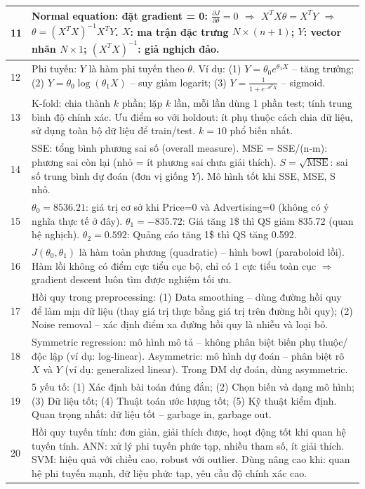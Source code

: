 \documentclass[10pt]{article}
\begin{document}
\begin{singlespace}
\begin{longtable}{|p{}|p{}|}
\hline
11 & Normal equation: đặt gradient = 0: $\frac{\partial J}{\partial \theta} = 0$ $\Rightarrow$ $X^TX\theta = X^TY$ $\Rightarrow$ $\theta = (X^TX)^{-1}X^TY$. $X$: ma trận đặc trưng $N \times (n+1)$; $Y$: vector nhãn $N \times 1$; $(X^TX)^{-1}$: giả nghịch đảo. \\
\hline
12 & Phi tuyến: $Y$ là hàm phi tuyến theo $\theta$. Ví dụ: (1) $Y = \theta_0 e^{\theta_1 X}$ -- tăng trưởng; (2) $Y = \theta_0 \log(\theta_1 X)$ -- suy giảm logarit; (3) $Y = \frac{1}{1+e^{-\theta^TX}}$ -- sigmoid. \\
\hline
13 & K-fold: chia thành $k$ phần; lặp $k$ lần, mỗi lần dùng 1 phần test; tính trung bình độ chính xác. Ưu điểm so với holdout: ít phụ thuộc cách chia dữ liệu, sử dụng toàn bộ dữ liệu để train/test. $k=10$ phổ biến nhất. \\
\hline
14 & SSE: tổng bình phương sai số (overall measure). MSE = SSE/(n-m): phương sai còn lại (nhỏ = ít phương sai chưa giải thích). $S = \sqrt{\text{MSE}}$: sai số trung bình dự đoán (đơn vị giống $Y$). Mô hình tốt khi SSE, MSE, S nhỏ. \\
\hline
15 & $\theta_0 = 8536.21$: giá trị cơ sở khi Price=0 và Advertising=0 (không có ý nghĩa thực tế ở đây). $\theta_1 = -835.72$: Giá tăng 1\$ thì QS giảm 835.72 (quan hệ nghịch). $\theta_2 = 0.592$: Quảng cáo tăng 1\$ thì QS tăng 0.592. \\
\hline
16 & $J(\theta_0, \theta_1)$ là hàm toàn phương (quadratic) -- hình bowl (paraboloid lồi). Hàm lồi không có điểm cực tiểu cục bộ, chỉ có 1 cực tiểu toàn cục $\Rightarrow$ gradient descent luôn tìm được nghiệm tối ưu. \\
\hline
17 & Hồi quy trong preprocessing: (1) Data smoothing -- dùng đường hồi quy để làm mịn dữ liệu (thay giá trị thực bằng giá trị trên đường hồi quy); (2) Noise removal -- xác định điểm xa đường hồi quy là nhiễu và loại bỏ. \\
\hline
18 & Symmetric regression: mô hình mô tả -- không phân biệt biến phụ thuộc/độc lập (ví dụ: log-linear). Asymmetric: mô hình dự đoán -- phân biệt rõ $X$ và $Y$ (ví dụ: generalized linear). Trong DM dự đoán, dùng asymmetric. \\
\hline
19 & 5 yếu tố: (1) Xác định bài toán đúng đắn; (2) Chọn biến và dạng mô hình; (3) Dữ liệu tốt; (4) Thuật toán ước lượng tốt; (5) Kỹ thuật kiểm định. Quan trọng nhất: dữ liệu tốt -- garbage in, garbage out. \\
\hline
20 & Hồi quy tuyến tính: đơn giản, giải thích được, hoạt động tốt khi quan hệ tuyến tính. ANN: xử lý phi tuyến phức tạp, nhiều tham số, ít giải thích. SVM: hiệu quả với chiều cao, robust với outlier. Dùng nâng cao khi: quan hệ phi tuyến mạnh, dữ liệu phức tạp, yêu cầu độ chính xác cao. \\
\hline
\end{longtable}
\end{singlespace}
\end{document}

